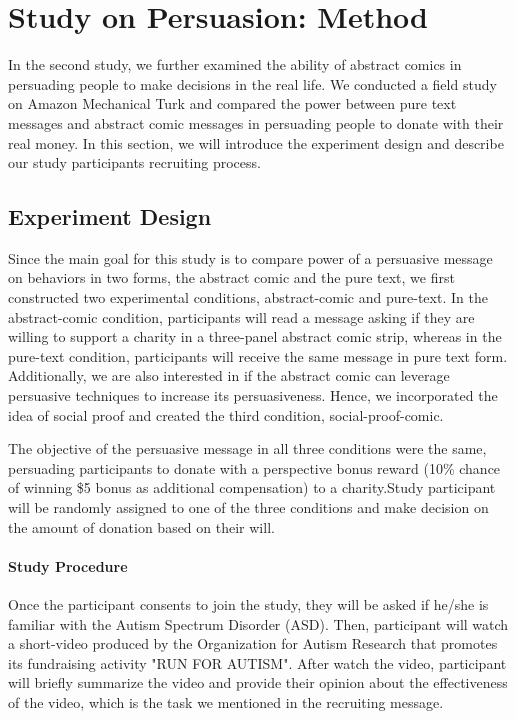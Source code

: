 \section{Study on Persuasion: Method}
\label{sec:Method2}

In the second study, we further examined the ability of abstract comics in persuading people to make decisions in the real life. We conducted a field study on Amazon Mechanical Turk and compared the power between pure text messages and abstract comic messages in persuading people to donate with their real money. In this section, we will introduce the experiment design and describe our study participants recruiting process.

\subsection{Experiment Design}
Since the main goal for this study is to compare power of a persuasive message on behaviors in two forms, the abstract comic and the pure text, we first constructed two experimental conditions, abstract-comic and pure-text. In the abstract-comic condition, participants will read a message asking if they are willing to support a charity in a three-panel abstract comic strip, whereas in the pure-text condition, participants will receive the same message in pure text form. Additionally, we are also interested in if the abstract comic can leverage persuasive techniques to increase its persuasiveness. Hence, we incorporated the idea of social proof and created the third condition, social-proof-comic.

The objective of the persuasive message in all three conditions were the same, persuading participants to donate with a perspective bonus reward (10\% chance of winning \$5 bonus as additional compensation) to a charity.Study participant will be randomly assigned to one of the three conditions and make decision on the amount of donation based on their will.

\paragraph{Study Procedure} Once the participant consents to join the study, they will be asked if he/she is familiar with the Autism Spectrum Disorder (ASD). Then, participant will watch a short-video produced by the Organization for Autism Research that promotes its fundraising activity "RUN FOR AUTISM". After watch the video, participant will briefly summarize the video and provide their opinion about the effectiveness of the video, which is the task we mentioned in the recruiting message.

